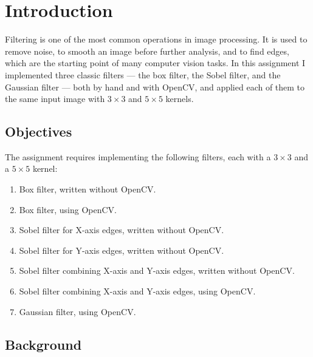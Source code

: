 \chapter{Introduction}
\label{ch:intro}


Filtering is one of the most common operations in image processing. It
is used to remove noise, to smooth an image before further analysis,
and to find edges, which are the starting point of many computer vision
tasks. In this assignment I implemented three classic filters --- the
box filter, the Sobel filter, and the Gaussian filter --- both by hand
and with OpenCV, and applied each of them to the same input image with
$3 \times 3$ and $5 \times 5$ kernels.

\section{Objectives}
\label{sec:objectives}

The assignment requires implementing the following filters, each with a
$3 \times 3$ and a $5 \times 5$ kernel:

\begin{enumerate}
  \item Box filter, written without OpenCV.
  \item Box filter, using OpenCV.
  \item Sobel filter for X-axis edges, written without OpenCV.
  \item Sobel filter for Y-axis edges, written without OpenCV.
  \item Sobel filter combining X-axis and Y-axis edges, written without
        OpenCV.
  \item Sobel filter combining X-axis and Y-axis edges, using OpenCV.
  \item Gaussian filter, using OpenCV.
\end{enumerate}


\section{Background}
\label{sec:background}

